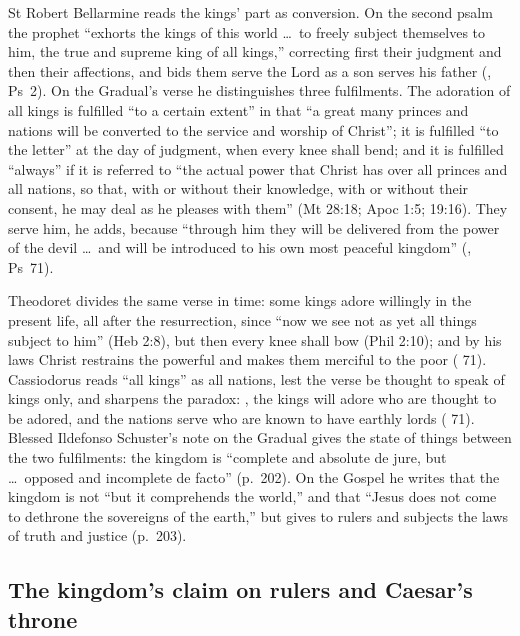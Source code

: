 St Robert Bellarmine reads the kings' part as conversion. On the second psalm
the prophet ``exhorts the kings of this world \dots\ to freely subject
themselves to him, the true and supreme king of all kings,'' correcting first
their judgment and then their affections, and bids them serve the Lord as a son
serves his father (, Ps~2). On the Gradual's verse he
distinguishes three fulfilments. The adoration of all kings is fulfilled ``to a
certain extent'' in that ``a great many princes and nations will be converted
to the service and worship of Christ''; it is fulfilled ``to the letter'' at the
day of judgment, when every knee shall bend; and it is fulfilled ``always'' if
it is referred to ``the actual power that Christ has over all princes and all
nations, so that, with or without their knowledge, with or without their
consent, he may deal as he pleases with them'' (Mt 28:18; Apoc 1:5; 19:16). They
serve him, he adds, because ``through him they will be delivered from the power
of the devil \dots\ and will be introduced to his own most peaceful kingdom''
(, Ps~71).

Theodoret divides the same verse in time: some kings adore willingly in the
present life, all after the resurrection, since ``now we see not as yet all
things subject to him'' (Heb 2:8), but then every knee shall bow (Phil 2:10);
and by his laws Christ restrains the powerful and makes them merciful to the
poor ( 71). Cassiodorus reads ``all kings'' as
all nations, lest the verse be thought to speak of kings only, and sharpens the
paradox: , the kings will adore who are thought
to be adored, and the nations serve who are known to have earthly lords
( 71). Blessed Ildefonso Schuster's note on
the Gradual gives the state of things between the two fulfilments: the kingdom
is ``complete and absolute de jure, but \dots\ opposed and incomplete de facto''
(p.~202). On the Gospel he writes that the kingdom is not  ``but it
comprehends the world,'' and that ``Jesus does not come to dethrone the
sovereigns of the earth,'' but gives to rulers and subjects the laws of truth
and justice (p.~203).

\subsection{The kingdom's claim on rulers and Caesar's throne}
\label{sec:hence-difficulty}

